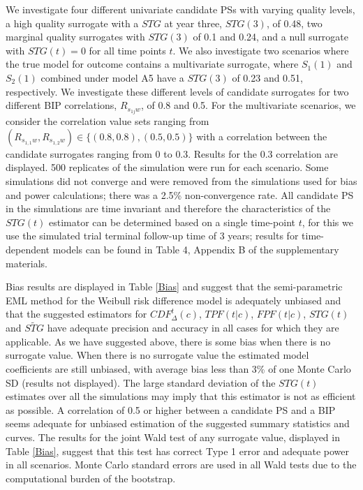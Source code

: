 \documentclass[times, doublespace]{simauth}
\begin{document}
We investigate four different univariate candidate PSs with varying quality levels, a high quality surrogate with a $STG$ at year three, $STG(3)$, of 0.48, two marginal quality surrogates with $STG(3)$ of 0.1 and 0.24, and a null surrogate with $STG(t)=0$ for all time points $t$. We also investigate two scenarios where the true model for outcome contains a multivariate surrogate, where $S_1(1)$ and $S_2(1)$ combined under model A5 have a $STG(3)$ of 0.23 and 0.51, respectively. We investigate these different levels of candidate surrogates for two different BIP correlations, $R_{s_{1j}w}$, of 0.8 and 0.5. For the multivariate scenarios, we consider the correlation value sets ranging from $(R_{s_{1,1}w},R_{s_{1,2}w})\in\{(0.8,0.8), (0.5, 0.5)\}$ with a correlation between the candidate surrogates ranging from 0 to 0.3. Results for the 0.3 correlation are displayed. 500 replicates of the simulation were run for each scenario.  Some simulations did not converge and were removed from the simulations used for bias and power calculations; there was a 2.5\% non-convergence rate.  All candidate PS in the simulations are time invariant and therefore the characteristics of the $STG(t)$ estimator can be determined based on a single time-point $t$, for this we use the simulated trial terminal follow-up time of  3 years; results for time-dependent models can be found in Table 4, Appendix B of the supplementary materials. 

Bias results are displayed in Table \ref{Bias} and suggest that the semi-parametric EML method for the Weibull risk difference model is adequately unbiased and that the suggested estimators for $CDF^{t}_{\Delta}(c)$, $TPF(t|c)$, $FPF(t|c)$, $STG(t)$ and $\widetilde{STG}$ have adequate precision and accuracy in all cases for which they are applicable. As we have suggested above, there is some bias when there is no surrogate value. When there is no surrogate value the estimated model coefficients are still unbiased, with average bias less than 3\% of one Monte Carlo SD (results not displayed). The large standard deviation of the $STG(t)$ estimates over all the simulations may imply that this estimator is not as efficient as possible. A correlation of 0.5 or higher between a candidate PS and a BIP seems adequate for unbiased estimation of the suggested summary statistics and curves. The results for the joint Wald test of any surrogate value, displayed in Table \ref{Bias}, suggest that this test has correct Type 1 error and adequate power in all scenarios. Monte Carlo standard errors are used in all Wald tests due to the computational burden of the bootstrap.
\end{document}
